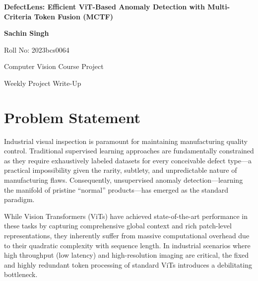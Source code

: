 \documentclass[12pt]{article}
\begin{document}
\begin{center}
    {\LARGE \textbf{DefectLens: Efficient ViT-Based Anomaly Detection with Multi-Criteria Token Fusion (MCTF)} \par}
    \vspace{0.5cm}
    {\large \textbf{Sachin Singh} \par}
    {\large Roll No: 2023bcs0064 \par}
    {\large Computer Vision Course Project \par}
    {\large Weekly Project Write-Up \par}
    \vspace{0.5cm}
\end{center}

\begin{abstract}
\noindent This report outlines the foundational requirements and architecture for the DefectLens project. It details the core problem of computational inefficiency in Vision Transformers (ViTs) for high-resolution industrial anomaly detection. Furthermore, it explains the motivation behind applying a Multi-Criteria Token Fusion (MCTF) architecture for real-time edge deployment, and the specific objectives the project intends to achieve to solve the stringent accuracy-latency trade-off in modern automated optical inspection systems.
\end{abstract}

\vspace{0.5cm}

\section{Problem Statement}
Industrial visual inspection is paramount for maintaining manufacturing quality control. Traditional supervised learning approaches are fundamentally constrained as they require exhaustively labeled datasets for every conceivable defect type---a practical impossibility given the rarity, subtlety, and unpredictable nature of manufacturing flaws. Consequently, unsupervised anomaly detection---learning the manifold of pristine ``normal'' products---has emerged as the standard paradigm.

While Vision Transformers (ViTs) have achieved state-of-the-art performance in these tasks by capturing comprehensive global context and rich patch-level representations, they inherently suffer from massive computational overhead due to their quadratic complexity with sequence length. In industrial scenarios where high throughput (low latency) and high-resolution imaging are critical, the fixed and highly redundant token processing of standard ViTs introduces a debilitating bottleneck. 
\end{document}
